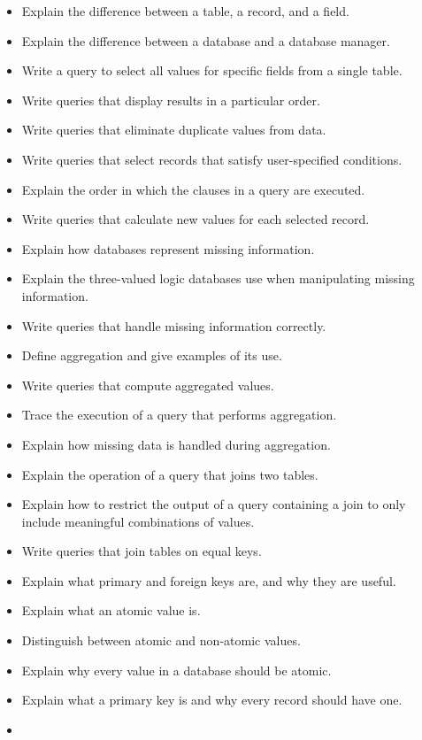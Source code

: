 \documentclass[]{book}
\providecommand{\tightlist}{%
  \setlength{\itemsep}{0pt}\setlength{\parskip}{0pt}}
\begin{document}
\begin{itemize}
\tightlist
\item
  Explain the difference between a table, a record, and a field.
\item
  Explain the difference between a database and a database manager.
\item
  Write a query to select all values for specific fields from a single
  table.
\item
  Write queries that display results in a particular order.
\item
  Write queries that eliminate duplicate values from data.
\item
  Write queries that select records that satisfy user-specified
  conditions.
\item
  Explain the order in which the clauses in a query are executed.
\item
  Write queries that calculate new values for each selected record.
\item
  Explain how databases represent missing information.
\item
  Explain the three-valued logic databases use when manipulating missing
  information.
\item
  Write queries that handle missing information correctly.
\item
  Define aggregation and give examples of its use.
\item
  Write queries that compute aggregated values.
\item
  Trace the execution of a query that performs aggregation.
\item
  Explain how missing data is handled during aggregation.
\item
  Explain the operation of a query that joins two tables.
\item
  Explain how to restrict the output of a query containing a join to
  only include meaningful combinations of values.
\item
  Write queries that join tables on equal keys.
\item
  Explain what primary and foreign keys are, and why they are useful.
\item
  Explain what an atomic value is.
\item
  Distinguish between atomic and non-atomic values.
\item
  Explain why every value in a database should be atomic.
\item
  Explain what a primary key is and why every record should have one.
\item

\end{itemize}
\end{document}
